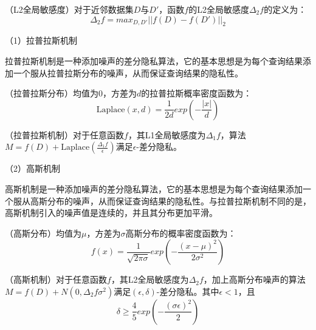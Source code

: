 \begin{definition}
	（L2全局敏感度\cite{Algorithmic_Foundations_of_DP}）对于近邻数据集$D$与$D'$，函数$f$的L2全局敏感度$\Delta_2f$的定义为：
	\begin{equation}
		\Delta_2f=max_{D,D'}||f(D)-f(D')||_2
	\end{equation}
\end{definition}


（1）拉普拉斯机制

拉普拉斯机制是一种添加噪声的差分隐私算法，它的基本思想是为每个查询结果添加一个服从拉普拉斯分布的噪声，从而保证查询结果的隐私性。

%
%

\begin{definition}
	（拉普拉斯分布）均值为0，方差为$d$的拉普拉斯概率密度函数为：
	\begin{equation}
		\text{Laplace}(x, d)=\frac{1}{2d}exp(-\frac{|x|}{d})
	\end{equation}
\end{definition}

\begin{theorem}
	（拉普拉斯机制\cite{dwork2006calibrating}）对于任意函数$f$，其L1全局敏感度为$\Delta_1f$，算法$M=f(D)+\text{Laplace}(\frac{\Delta_1f}{\epsilon})$满足$\epsilon$-差分隐私。
\end{theorem}

（2）高斯机制

高斯机制是一种添加噪声的差分隐私算法，它的基本思想是为每个查询结果添加一个服从高斯分布的噪声，从而保证查询结果的隐私性。与拉普拉斯机制不同的是，高斯机制引入的噪声值是连续的，并且其分布更加平滑。

\begin{definition}
	（高斯分布）均值为$\mu$，方差为$\sigma$高斯分布的概率密度函数为：
	\begin{equation}
		f(x)=\frac{1}{\sqrt{2\pi\sigma}}exp(-\frac{(x-\mu)^2}{2\sigma^2})
	\end{equation}
\end{definition}

\begin{theorem}
	（高斯机制\cite{Algorithmic_Foundations_of_DP}）对于任意函数$f$，其L2全局敏感度为$\Delta_2f$，加上高斯分布噪声的算法$M=f(D)+N(0,\Delta_2f\sigma^2)$满足$(\epsilon, \delta)$-差分隐私。其中$\epsilon<1$，且
	$$\delta\geq \frac{4}{5}exp(-\frac{(\sigma\epsilon)^2}{2})$$
\end{theorem}

